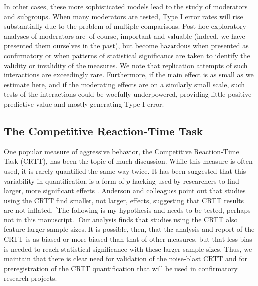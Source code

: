 \documentclass[man]{apa6}
\begin{document}
In other cases, these more sophisticated models lead to the study of moderators and subgroups. When many moderators are tested, Type I error rates will rise substantially due to the problem of multiple comparisons. Post-hoc exploratory analyses of moderators are, of course, important and valuable (indeed, we have presented them ourselves in the past), but become hazardous when presented as confirmatory or when patterns of statistical significance are taken to identify the validity or invalidity of the measures. We note that replication attempts of such interactions are exceedingly rare. Furthermore, if the main effect is as small as we estimate here, and if the moderating effects are on a similarly small scale, such tests of the interactions could be woefully underpowered, providing little positive predictive value and mostly generating Type I error.

\subsection{The Competitive Reaction-Time Task}
One popular measure of aggressive behavior, the Competitive Reaction-Time Task (CRTT), has been the topic of much discussion. While this measure is often used, it is rarely quantified the same way twice. It has been suggested that this variability in quantification is a form of $p$-hacking used by researchers to find larger, more significant effects \citep{Elson:etal:2014}. Anderson and colleagues point out that studies using the CRTT find smaller, not larger, effects, suggesting that CRTT results are not inflated.
[The following is my hypothesis and needs to be tested, perhaps not in this manuscript.] Our analysis finds that studies using the CRTT also feature larger sample sizes. It is possible, then, that the analysis and report of the CRTT is as biased or more biased than that of other measures, but that less bias is needed to reach statistical significance with these larger sample sizes. Thus, we maintain that there is clear need for validation of the noise-blast CRTT and for preregistration of the CRTT quantification that will be used in confirmatory research projects.

\end{document}
